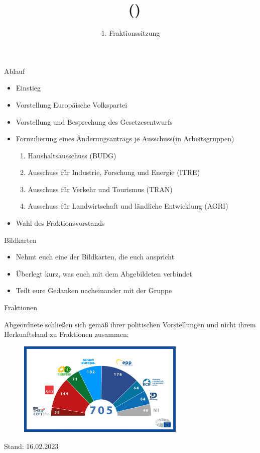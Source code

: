 \documentclass{beamer}
\title{\Fraktionsname\ (\Fraktionskuerzel)}
\subtitle{1. Fraktionssitzung}
\newcommand{\Fraktionsname}{Europäische Volkspartei}
\newcommand{\Fraktionsname}{Progressive Allianz der Sozialdemokraten}
\newcommand{\Fraktionsname}{Renew Europe}
\newcommand{\Fraktionsname}{Die Grünen/Europäische Freie Allianz}
\newcommand{\Fraktionsname}{Identität \& Demokratie}
\newcommand{\ausschuesse}{
   		     \begin{enumerate}
        		    \item Haushaltsausschuss (BUDG)
            		\item Ausschuss für Industrie, Forschung und Energie (ITRE)
    	    		    \item Ausschuss für Verkehr und Tourismus (TRAN)
    		        \item Ausschuss für Landwirtschaft und ländliche Entwicklung (AGRI)
	        \end{enumerate}
		}
\newcommand{\ausschuesse}{
            \begin{enumerate}
                \item Ausschuss für bürgerliche Freiheiten, Justiz und Inneres (LIBE)
                \item Ausschuss für Auswärtige Angelegenheiten (AFET)
                \item Unterausschuss für Menschenrechte (DROI)
            \end{enumerate}
    		}
\newcommand{\ausschuesse}{
            \begin{enumerate}
                \item Haushaltsausschuss (BUDG)
                \item Ausschuss für bürgerliche Freiheiten, Justiz und Inneres (LIBE)
                \item Unterausschuss für Sicherheit und Verteidigung (SEDE)
            \end{enumerate}
    		}
\begin{document}
\frame{\titlepage}



\begin{frame}{Ablauf}
\vspace{-1.5cm}
\begin{itemize}
    \item Einstieg
    \item Vorstellung \Fraktionsname
    \item Vorstellung und Besprechung des Gesetzesentwurfs
    \item Formulierung eines Änderungsantrags je Ausschuss\newline (in Arbeitsgruppen)
    \ausschuesse
    \item Wahl des Fraktionsvorstands
\end{itemize}
\end{frame}

\begin{frame}{Bildkarten}
\vspace{-1cm}
\begin{itemize}
    \item Nehmt euch eine der Bildkarten, die euch anspricht
    \item Überlegt kurz, was euch mit dem Abgebildeten verbindet
    \item Teilt eure Gedanken nacheinander mit der Gruppe
\end{itemize}
\end{frame}

\begin{frame}{Fraktionen}
\vspace{-0.5cm}
\begin{center}
    Abgeordnete schließen sich gemäß ihrer politischen Vorstellungen und nicht ihrem Herkunftsland zu Fraktionen zusammen:
\end{center}
\begin{figure}[h]
    \centering
    \includegraphics[width=8cm]{Bilder/EP_seats.jpg}
\end{figure}
\begin{center}
    {\tiny Stand: 16.02.2023}
\end{center}
\end{frame}
\end{document}
